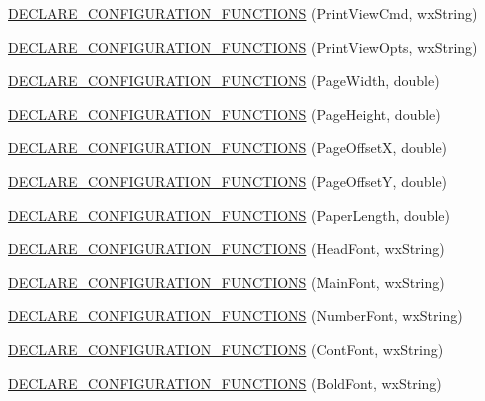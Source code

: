 \begin{DoxyCompactItemize}
\item 
\hyperlink{a00191_ab984ae44fe8470bf74213b129de057db}{D\-E\-C\-L\-A\-R\-E\-\_\-\-C\-O\-N\-F\-I\-G\-U\-R\-A\-T\-I\-O\-N\-\_\-\-F\-U\-N\-C\-T\-I\-O\-N\-S} (Print\-View\-Cmd, wx\-String)
\item 
\hyperlink{a00191_a7d720676ba7aa1410cb2332e177e7fe8}{D\-E\-C\-L\-A\-R\-E\-\_\-\-C\-O\-N\-F\-I\-G\-U\-R\-A\-T\-I\-O\-N\-\_\-\-F\-U\-N\-C\-T\-I\-O\-N\-S} (Print\-View\-Opts, wx\-String)
\item 
\hyperlink{a00191_a382b534f64ba5980434fa1cf6782a52c}{D\-E\-C\-L\-A\-R\-E\-\_\-\-C\-O\-N\-F\-I\-G\-U\-R\-A\-T\-I\-O\-N\-\_\-\-F\-U\-N\-C\-T\-I\-O\-N\-S} (Page\-Width, double)
\item 
\hyperlink{a00191_a9cfe786f79f767381eb577b7aba9c396}{D\-E\-C\-L\-A\-R\-E\-\_\-\-C\-O\-N\-F\-I\-G\-U\-R\-A\-T\-I\-O\-N\-\_\-\-F\-U\-N\-C\-T\-I\-O\-N\-S} (Page\-Height, double)
\item 
\hyperlink{a00191_ae665601134591aa3b6acb6257325befc}{D\-E\-C\-L\-A\-R\-E\-\_\-\-C\-O\-N\-F\-I\-G\-U\-R\-A\-T\-I\-O\-N\-\_\-\-F\-U\-N\-C\-T\-I\-O\-N\-S} (Page\-Offset\-X, double)
\item 
\hyperlink{a00191_aae35708cccc3c372ada386c35afc2269}{D\-E\-C\-L\-A\-R\-E\-\_\-\-C\-O\-N\-F\-I\-G\-U\-R\-A\-T\-I\-O\-N\-\_\-\-F\-U\-N\-C\-T\-I\-O\-N\-S} (Page\-Offset\-Y, double)
\item 
\hyperlink{a00191_a9511d7e9432cb181ae1603dc621ceb4a}{D\-E\-C\-L\-A\-R\-E\-\_\-\-C\-O\-N\-F\-I\-G\-U\-R\-A\-T\-I\-O\-N\-\_\-\-F\-U\-N\-C\-T\-I\-O\-N\-S} (Paper\-Length, double)
\item 
\hyperlink{a00191_af8dba43abfa69b93ebac3efa7fc1ea5f}{D\-E\-C\-L\-A\-R\-E\-\_\-\-C\-O\-N\-F\-I\-G\-U\-R\-A\-T\-I\-O\-N\-\_\-\-F\-U\-N\-C\-T\-I\-O\-N\-S} (Head\-Font, wx\-String)
\item 
\hyperlink{a00191_a232a13858e17ee4f91d7e1d80cd2bc9a}{D\-E\-C\-L\-A\-R\-E\-\_\-\-C\-O\-N\-F\-I\-G\-U\-R\-A\-T\-I\-O\-N\-\_\-\-F\-U\-N\-C\-T\-I\-O\-N\-S} (Main\-Font, wx\-String)
\item 
\hyperlink{a00191_a6cdcd96f15861b7998409f0b55ea2202}{D\-E\-C\-L\-A\-R\-E\-\_\-\-C\-O\-N\-F\-I\-G\-U\-R\-A\-T\-I\-O\-N\-\_\-\-F\-U\-N\-C\-T\-I\-O\-N\-S} (Number\-Font, wx\-String)
\item 
\hyperlink{a00191_a90c9add8326d4716091beb181b400017}{D\-E\-C\-L\-A\-R\-E\-\_\-\-C\-O\-N\-F\-I\-G\-U\-R\-A\-T\-I\-O\-N\-\_\-\-F\-U\-N\-C\-T\-I\-O\-N\-S} (Cont\-Font, wx\-String)
\item 
\hyperlink{a00191_ae45a1dcd3188f0d7b6ca11bfe12ad058}{D\-E\-C\-L\-A\-R\-E\-\_\-\-C\-O\-N\-F\-I\-G\-U\-R\-A\-T\-I\-O\-N\-\_\-\-F\-U\-N\-C\-T\-I\-O\-N\-S} (Bold\-Font, wx\-String)

\end{DoxyCompactItemize}
